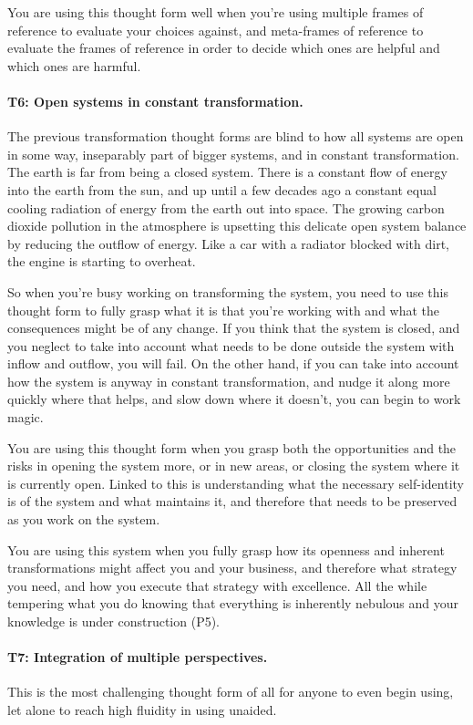 You are using this thought form well when you're using multiple frames of reference  to evaluate your choices against, and meta-frames of reference to evaluate the frames of reference in order to decide which ones are helpful and which ones are harmful.
\paragraph{\textbf{T6: Open systems in constant transformation.}}
The previous transformation thought forms are blind to how all systems are open in some way, inseparably part of bigger systems, and in constant transformation. The earth is far from being a closed system. There is a constant flow of energy into the earth from the sun, and up until a few decades ago a constant equal cooling radiation of energy from the earth out into space. The growing carbon dioxide pollution in the atmosphere is upsetting this delicate open system balance by reducing the outflow of energy. Like a car with a radiator blocked with dirt, the engine is starting to overheat.


So when you're busy working on transforming the system, you need to use this thought form to fully grasp what it is that you're working with and what the consequences might be of any change. If you think that the system is closed, and you neglect to take into account what needs to be done outside the system with inflow and outflow, you will fail. On the other hand, if you can take into account how the system is anyway in constant transformation, and nudge it along more quickly where that helps, and slow down where it doesn't, you can begin to work magic.


You are using this thought form when you grasp both the opportunities and the risks in opening the system more, or in new areas, or closing the system where it is currently open. Linked to this is understanding what the necessary self-identity is of the system and what maintains it, and therefore that needs to be preserved as you work on the system.


You are using this system when you fully grasp how its openness and inherent transformations might affect you and your business, and therefore what strategy you need, and how you execute that strategy with excellence. All the while tempering what you do knowing that everything is inherently nebulous and your knowledge is under construction (P5).
\paragraph{\textbf{T7: Integration of multiple perspectives.}}
This is the most challenging thought form of all for anyone to even begin using, let alone to reach high fluidity in using unaided. 


